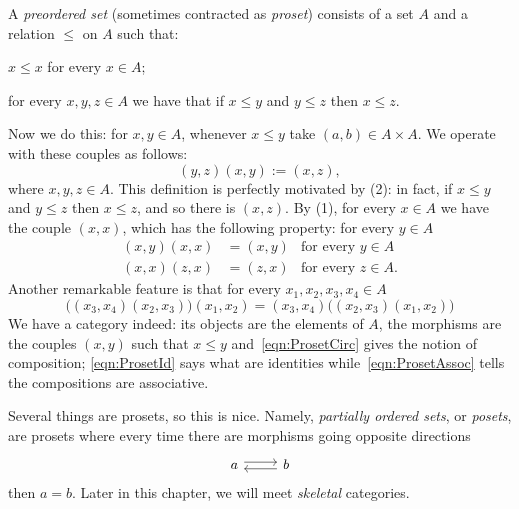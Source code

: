 \begin{example}
A {\em preordered set} (sometimes contracted as {\em proset}) consists of a set \(A\) and a relation \(\le\) on \(A\) such that:
\begin{tcbenum}
\item \(x \le x\) for every \(x \in A\);
\item for every \(x, y, z \in A\) we have that if \(x \le y\) and \(y \le z\) then \(x \le z\).
\end{tcbenum}
Now we do this: for \(x, y \in A\), whenever \(x \le y\) take \((a, b) \in A \times A\). We operate with these couples as follows:
\begin{equation}
(y, z) (x, y) := (x, z), \label{eqn:ProsetCirc}
\end{equation}
where \(x, y, z \in A\). This definition is perfectly motivated by (2): in fact, if \(x \le y\) and \(y \le z\) then \(x \le z\), and so there is \((x, z)\). By (1), for every \(x \in A\) we have the couple \((x, x)\), which has the following property: for every \(y \in A\)
\begin{equation}
\begin{aligned}
(x, y) (x, x) &= (x, y) & \text{for every } y \in A \\
(x, x) (z, x) &= (z, x) & \text{for every } z \in A .
\end{aligned}\label{eqn:ProsetId}
\end{equation}
Another remarkable feature is that for every \(x_1, x_2, x_3, x_4 \in A\)
\begin{equation}
\big((x_3, x_4)(x_2, x_3)\big)(x_1, x_2) = (x_3, x_4)\big((x_2, x_3)(x_1, x_2)\big)\label{eqn:ProsetAssoc}
\end{equation}
We have a category indeed: its objects are the elements of \(A\), the morphisms are the couples \((x, y)\) such that \(x \le y\) and~\eqref{eqn:ProsetCirc} gives the notion of composition; \eqref{eqn:ProsetId} says what are identities while~\eqref{eqn:ProsetAssoc} tells the compositions are associative.
\end{example}

Several things are prosets, so this is nice. Namely, {\em partially ordered sets}, or {\em posets}, are prosets where every time there are morphisms going opposite directions
\[\begin{tikzcd}
a \ar[r, shift left] & b \ar[l, shift left]
\end{tikzcd}\]
then \(a = b\). Later in this chapter, we will meet {\em skeletal} categories.

